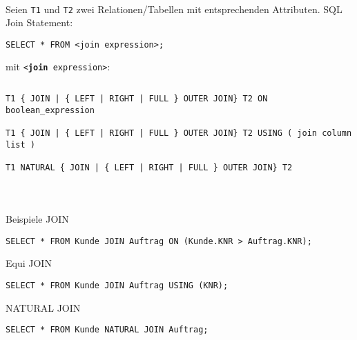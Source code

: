 \begin{frame}[fragile]\frametitle{\insertsection}
\framesubtitle{\insertsubsection}
\onslide
{}\\[4pt]
Seien \texttt{T1} und \texttt{T2} zwei Relationen/Tabellen mit entsprechenden Attributen.
\pause 
\abs
SQL Join Statement:
\begin{lstlisting}[xleftmargin=3ex, numbers=none]
SELECT * FROM <join expression>;
\end{lstlisting}
\pause
mit \texttt{<\textbf{join} expression>}:
\begin{columns}
\begin{column}{.98\textwidth}
\begin{lstlisting}[xleftmargin=3ex,numbers=none]
T1 { JOIN | { LEFT | RIGHT | FULL } OUTER JOIN} T2 ON boolean_expression
	
T1 { JOIN | { LEFT | RIGHT | FULL } OUTER JOIN} T2 USING ( join column list )
	
T1 NATURAL { JOIN | { LEFT | RIGHT | FULL } OUTER JOIN} T2
\end{lstlisting}
\end{column}
\end{columns}
\end{frame}

\begin{frame}[fragile]\frametitle{\insertsection}
\framesubtitle{\insertsubsection}
\onslide
{}\\[4pt]
Beispiele
\abs
JOIN
\begin{lstlisting}[xleftmargin=3ex, numbers=none]
SELECT * FROM Kunde JOIN Auftrag ON (Kunde.KNR > Auftrag.KNR);
\end{lstlisting}
\abs
Equi JOIN
\begin{lstlisting}[xleftmargin=3ex, numbers=none]
SELECT * FROM Kunde JOIN Auftrag USING (KNR);
\end{lstlisting}
\abs 
NATURAL JOIN
\begin{lstlisting}[xleftmargin=3ex, numbers=none]
SELECT * FROM Kunde NATURAL JOIN Auftrag;
\end{lstlisting}
\end{frame}

